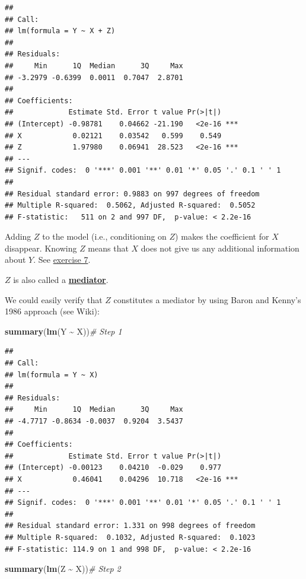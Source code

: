 \documentclass[
]{book}
\newenvironment{Shaded}{\begin{snugshade}}{\end{snugshade}}
\newcommand{\CommentTok}[1]{\textcolor[rgb]{0.56,0.35,0.01}{\textit{#1}}}
\newcommand{\FunctionTok}[1]{\textcolor[rgb]{0.13,0.29,0.53}{\textbf{#1}}}
\newcommand{\NormalTok}[1]{#1}
\newcommand{\SpecialCharTok}[1]{\textcolor[rgb]{0.81,0.36,0.00}{\textbf{#1}}}
\begin{document}
\begin{verbatim}
## 
## Call:
## lm(formula = Y ~ X + Z)
## 
## Residuals:
##     Min      1Q  Median      3Q     Max 
## -3.2979 -0.6399  0.0011  0.7047  2.8701 
## 
## Coefficients:
##             Estimate Std. Error t value Pr(>|t|)    
## (Intercept) -0.98781    0.04662 -21.190   <2e-16 ***
## X            0.02121    0.03542   0.599    0.549    
## Z            1.97980    0.06941  28.523   <2e-16 ***
## ---
## Signif. codes:  0 '***' 0.001 '**' 0.01 '*' 0.05 '.' 0.1 ' ' 1
## 
## Residual standard error: 0.9883 on 997 degrees of freedom
## Multiple R-squared:  0.5062, Adjusted R-squared:  0.5052 
## F-statistic:   511 on 2 and 997 DF,  p-value: < 2.2e-16
\end{verbatim}

Adding \(Z\) to the model (i.e., conditioning on \(Z\)) makes the coefficient for \(X\) disappear.
Knowing \(Z\) means that \(X\) does not give us any additional information about \(Y\).
See \hyperref[exercise7_multiple_regression]{exercise 7}.

\(Z\) is also called a \href{https://en.wikipedia.org/wiki/Mediation_(statistics)}{\textbf{mediator}}.

We could easily verify that \(Z\) constitutes a mediator by using Baron and
Kenny's 1986 approach (see Wiki):

\begin{Shaded}
\begin{Highlighting}[]
\FunctionTok{summary}\NormalTok{(}\FunctionTok{lm}\NormalTok{(Y }\SpecialCharTok{\textasciitilde{}}\NormalTok{ X))}\CommentTok{\# Step 1}
\end{Highlighting}
\end{Shaded}

\begin{verbatim}
## 
## Call:
## lm(formula = Y ~ X)
## 
## Residuals:
##     Min      1Q  Median      3Q     Max 
## -4.7717 -0.8634 -0.0037  0.9204  3.5437 
## 
## Coefficients:
##             Estimate Std. Error t value Pr(>|t|)    
## (Intercept) -0.00123    0.04210  -0.029    0.977    
## X            0.46041    0.04296  10.718   <2e-16 ***
## ---
## Signif. codes:  0 '***' 0.001 '**' 0.01 '*' 0.05 '.' 0.1 ' ' 1
## 
## Residual standard error: 1.331 on 998 degrees of freedom
## Multiple R-squared:  0.1032, Adjusted R-squared:  0.1023 
## F-statistic: 114.9 on 1 and 998 DF,  p-value: < 2.2e-16
\end{verbatim}

\begin{Shaded}
\begin{Highlighting}[]
\FunctionTok{summary}\NormalTok{(}\FunctionTok{lm}\NormalTok{(Z }\SpecialCharTok{\textasciitilde{}}\NormalTok{ X))}\CommentTok{\# Step 2}
\end{Highlighting}
\end{Shaded}
\end{document}
